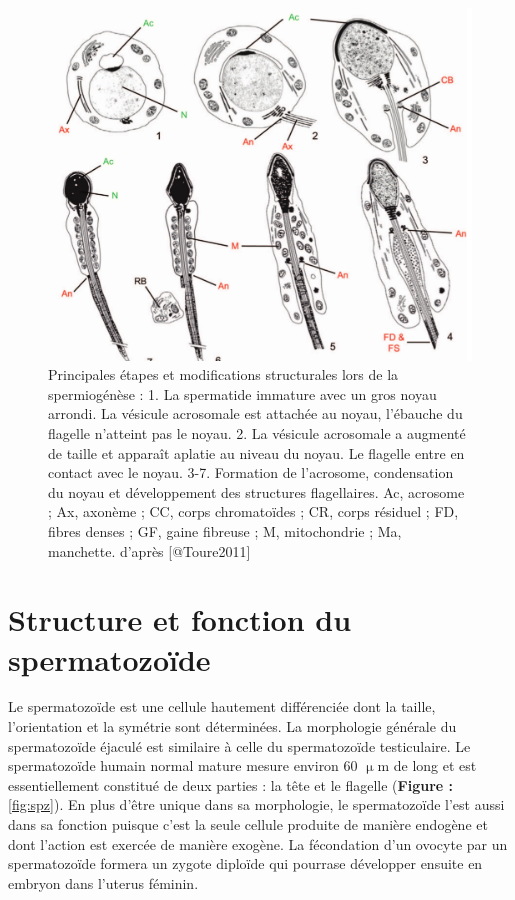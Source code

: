 \documentclass[12pt,twoside]{reedthesis}
\theoremstyle{definition}
\theoremstyle{definition}
\theoremstyle{remark}
\begin{document}
  \begin{figure}
  
  {\centering \includegraphics[scale=0.3]{figure/spermiogenese} 
  
  }
  
  \caption[Principales étapes et modifications structurales lors de la spermiogénèse]{Principales étapes et modifications structurales lors de la spermiogénèse : 1. La spermatide immature avec un gros noyau arrondi. La vésicule acrosomale est attachée au noyau, l’ébauche du flagelle n’atteint pas le noyau. 2. La vésicule acrosomale a augmenté de taille et apparaît aplatie au niveau du noyau. Le flagelle entre en contact avec le noyau. 3-7. Formation de l’acrosome, condensation du noyau et développement des structures flagellaires. Ac, acrosome ; Ax, axonème ; CC, corps chromatoïdes ; CR, corps résiduel ; FD, fibres denses ; GF, gaine fibreuse ; M, mitochondrie ; Ma, manchette. d'après [@Toure2011]}\label{fig:spermiogenese}
  \end{figure}
  
  \newpage  
  
  \section{Structure et fonction du
  spermatozoïde}\label{structure-et-fonction-du-spermatozoide}
  
  Le spermatozoïde est une cellule hautement différenciée dont la taille,
  l'orientation et la symétrie sont déterminées. La morphologie générale
  du spermatozoïde éjaculé est similaire à celle du spermatozoïde
  testiculaire. Le spermatozoïde humain normal mature mesure environ 60
  \(\upmu\)m de long et est essentiellement constitué de deux parties : la
  tête et le flagelle (\textbf{Figure : }\ref{fig:spz}). En plus d'être
  unique dans sa morphologie, le spermatozoïde l'est aussi dans sa
  fonction puisque c'est la seule cellule produite de manière endogène et
  dont l'action est exercée de manière exogène. La fécondation d'un
  ovocyte par un spermatozoïde formera un zygote diploïde qui pourrase
  développer ensuite en embryon dans l'uterus féminin.
  
\end{document}
